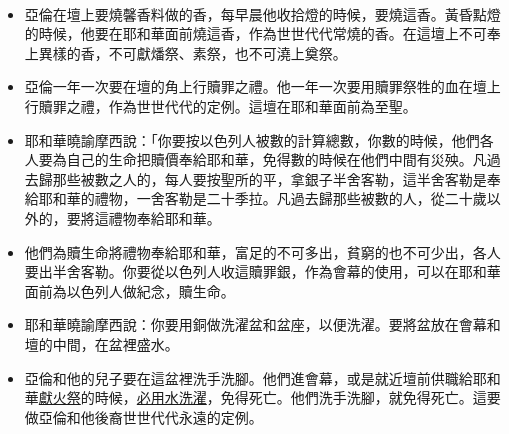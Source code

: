 \begin{table}
\vspace*{-5mm}
 \begin{itemize} 
\itemsep-.35em
\item 亞倫在壇上要燒馨香料做的香，每早晨他收拾燈的時候，要燒這香。黃昏點燈的時候，他要在耶和華面前燒這香，作為世世代代常燒的香。在這壇上不可奉上異樣的香，不可獻燔祭、素祭，也不可澆上奠祭。
\item 亞倫一年一次要在壇的角上行贖罪之禮。他一年一次要用贖罪祭牲的血在壇上行贖罪之禮，作為世世代代的定例。這壇在耶和華面前為至聖。
\end{itemize}

\begin{itemize} 
\itemsep-.35em
\item 耶和華曉諭摩西說：「你要按以色列人被數的計算總數，你數的時候，他們各人要為自己的生命把贖價奉給耶和華，免得數的時候在他們中間有災殃。凡過去歸那些被數之人的，每人要按聖所的平，拿銀子半舍客勒，這半舍客勒是奉給耶和華的禮物，一舍客勒是二十季拉。凡過去歸那些被數的人，從二十歲以外的，要將這禮物奉給耶和華。
\item 他們為贖生命將禮物奉給耶和華，富足的不可多出，貧窮的也不可少出，各人要出半舍客勒。你要從以色列人收這贖罪銀，作為會幕的使用，可以在耶和華面前為以色列人做紀念，贖生命。
\end{itemize}

\begin{itemize} 
\itemsep-.35em
\item 耶和華曉諭摩西說：你要用銅做洗濯盆和盆座，以便洗濯。要將盆放在會幕和壇的中間，在盆裡盛水。
\item 亞倫和他的兒子要在這盆裡洗手洗腳。他們進會幕，或是就近壇前供職給耶和華\underline{獻火祭}的時候，\underline{必用水洗濯}，免得死亡。他們洗手洗腳，就免得死亡。這要做亞倫和他後裔世世代代永遠的定例。
\end{itemize}



\end{table}
